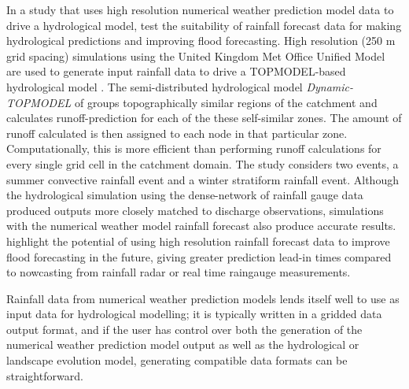 In a study that uses high resolution numerical weather prediction model data to drive a hydrological model, \citet{younger2008usability} test the suitability of rainfall forecast data for making hydrological predictions and improving flood forecasting. High resolution (250 m grid spacing) simulations using the United Kingdom Met Office Unified Model are used to generate input rainfall data to drive a TOPMODEL-based hydrological model \citep{beven2001dynamic}. The semi-distributed hydrological model \textit{Dynamic-TOPMODEL} of \citet{beven2001dynamic} groups topographically similar regions of the catchment and calculates runoff-prediction for each of the these self-similar zones. The amount of runoff calculated is then assigned to each node in that particular zone. Computationally, this is more efficient than performing runoff calculations for every single grid cell in the catchment domain.
The \citet{younger2008usability} study considers two events, a summer convective rainfall event and a winter stratiform rainfall event. Although the hydrological simulation using the dense-network of rainfall gauge data produced outputs more closely matched to discharge observations, simulations with the numerical weather model rainfall forecast also produce accurate results. \citet{younger2008usability} highlight the potential of using high resolution rainfall forecast data to improve flood forecasting in the future, giving greater prediction lead-in times compared to nowcasting from rainfall radar or real time raingauge measurements. 

Rainfall data from numerical weather prediction models lends itself well to use as input data for hydrological modelling; it is typically written in a gridded data output format, and if the user has control over both the generation of the numerical weather prediction model output as well as the hydrological or landscape evolution model, generating compatible data formats can be straightforward.

